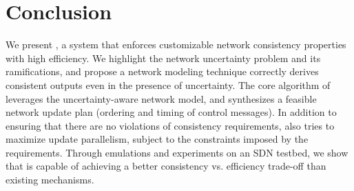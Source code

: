 \section{Conclusion}
\label{sec:conclusion}
We present \name, a system that enforces customizable network consistency properties 
with high efficiency.
We highlight the network uncertainty problem and its ramifications, 
and propose a network modeling technique correctly derives consistent outputs even in the presence
of uncertainty.
The core algorithm of \name leverages the uncertainty-aware network model, 
and synthesizes a feasible network update plan (ordering and timing of control messages).
In addition to ensuring that there are no violations of consistency requirements,
\name also tries to maximize update parallelism, subject to the constraints imposed by the requirements.
Through emulations and experiments on an SDN testbed, 
we show that \name is capable of achieving a better consistency vs.
efficiency trade-off than existing mechanisms.





